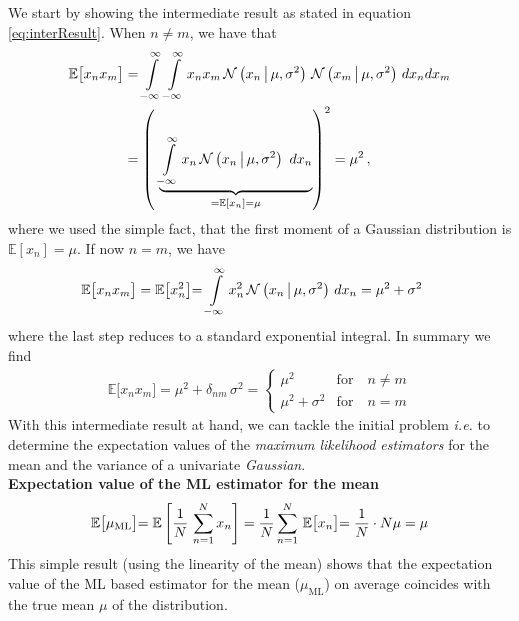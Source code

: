 \documentclass[11pt, DINA4, fleqn]{amsart}
\begin{document}
We start by showing the intermediate result as stated in equation \eqref{eq:interResult}. When $n\neq m$, we have that
\begin{align}
\mathbb{E}\bigl[x_n x_m\bigl] &=
\int \displaylimits_{-\infty}^{\infty}\int \displaylimits_{-\infty}^{\infty}
x_n x_m \, 
\mathcal{N}\left(x_n \,\bigl| \, \mu, \sigma^2\right) \,
\mathcal{N}\left(x_m \,\bigl| \, \mu, \sigma^2\right) \, dx_n dx_m \\
&= 
\left( \, \,
\underbrace{
\int \displaylimits_{-\infty}^{\infty}
x_n \,
\mathcal{N}\left(x_n \,\bigl| \, \mu, \sigma^2\right) \, \, dx_n
}_{=\mathbb{E}[x_n] = \mu}\right)^2
= \mu^2 \, ,
\end{align}
where we used the simple fact, that the first moment of a Gaussian distribution is $\mathbb{E}[x_n] = \mu$.
If now $n=m$, we have
\begin{align}
\mathbb{E}\bigl[x_n x_m\bigl] &= \mathbb{E}\bigl[x_n^2\bigl] = \int \displaylimits_{-\infty}^{\infty}
x_n^2 \, 
\mathcal{N}\left(x_n \,\bigl| \, \mu, \sigma^2\right) \, dx_n =
\mu^2 + \sigma^2 \,
\label{eq:2ndmoment}
\end{align}
where the last step reduces to a standard exponential integral.
In summary we find
\begin{align}
\mathbb{E}\bigl[x_n x_m\bigl] 
 = \mu^2 + \delta_{nm} \, \sigma^2
 =\begin{cases}
 \mu^2 & \text{for} \quad n\neq m \\
 \mu^2 + \sigma^2 & \text{for} \quad n = m
 \end{cases}
\end{align}
With this intermediate result at hand, we can tackle the initial problem \textit{i.e.} to determine the expectation values of the \emph{maximum likelihood estimators} for the mean and the variance of a univariate \emph{Gaussian}. \\

\noindent
\textbf{Expectation value of the ML estimator for the mean}\\
\begin{align}
\mathbb{E}\bigl[\mu_{\text{ML}}\bigl] = 
\mathbb{E}\left[\dfrac{1}{N} \, \sum\displaylimits_{n=1}^{N} x_n\right] = \dfrac{1}{N} \sum \displaylimits_{n=1}^{N} \, \mathbb{E}\bigl[x_n\bigl] = \dfrac{1}{N} \cdot N \mu = \mu
\end{align}
This simple result (using the linearity of the mean) shows that the expectation value of the ML based estimator for the mean ($\mu_{\text{ML}}$) on average coincides with the true mean $\mu$ of the distribution.\\
\end{document}
